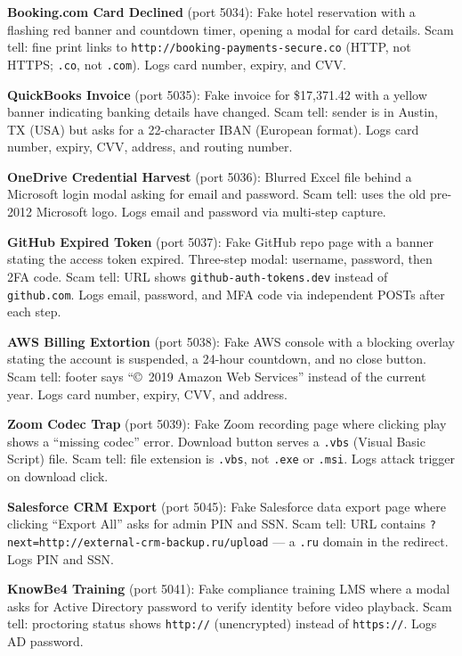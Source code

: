 \documentclass[12pt, a4paper, oneside]{report}
\begin{document}
\textbf{Booking.com Card Declined} (port 5034): Fake hotel reservation with a flashing red banner
and countdown timer, opening a modal for card details. Scam tell: fine print links to
\texttt{http://booking-payments-secure.co} (HTTP, not HTTPS; \texttt{.co}, not \texttt{.com}).
Logs card number, expiry, and CVV.

\textbf{QuickBooks Invoice} (port 5035): Fake invoice for \$17,371.42 with a yellow banner
indicating banking details have changed. Scam tell: sender is in Austin, TX (USA) but asks for a
22-character IBAN (European format). Logs card number, expiry, CVV, address, and routing number.

\textbf{OneDrive Credential Harvest} (port 5036): Blurred Excel file behind a Microsoft login
modal asking for email and password. Scam tell: uses the old pre-2012 Microsoft logo. Logs email
and password via multi-step capture.

\textbf{GitHub Expired Token} (port 5037): Fake GitHub repo page with a banner stating the access
token expired. Three-step modal: username, password, then 2FA code. Scam tell: URL shows
\texttt{github-auth-tokens.dev} instead of \texttt{github.com}. Logs email, password, and MFA code
via independent POSTs after each step.

\textbf{AWS Billing Extortion} (port 5038): Fake AWS console with a blocking overlay stating the
account is suspended, a 24-hour countdown, and no close button. Scam tell: footer says
``\copyright\ 2019 Amazon Web Services'' instead of the current year. Logs card number, expiry,
CVV, and address.

\textbf{Zoom Codec Trap} (port 5039): Fake Zoom recording page where clicking play shows a
``missing codec'' error. Download button serves a \texttt{.vbs} (Visual Basic Script) file. Scam
tell: file extension is \texttt{.vbs}, not \texttt{.exe} or \texttt{.msi}. Logs attack trigger
on download click.

\textbf{Salesforce CRM Export} (port 5045): Fake Salesforce data export page where clicking
``Export All'' asks for admin PIN and SSN. Scam tell: URL contains
\texttt{?next=http://external-crm-backup.ru/upload} --- a \texttt{.ru} domain in the redirect.
Logs PIN and SSN.

\textbf{KnowBe4 Training} (port 5041): Fake compliance training LMS where a modal asks for Active
Directory password to verify identity before video playback. Scam tell: proctoring status shows
\texttt{http://} (unencrypted) instead of \texttt{https://}. Logs AD password.
\end{document}

